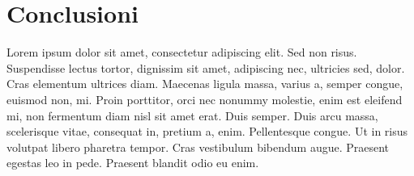 \section*{Conclusioni}
\label{sec:conclusioni}
Lorem ipsum dolor sit amet, consectetur adipiscing elit. Sed non risus. Suspendisse lectus tortor, dignissim sit amet, adipiscing nec, ultricies sed, dolor. Cras elementum ultrices diam. Maecenas ligula massa, varius a, semper congue, euismod non, mi. Proin porttitor, orci nec nonummy molestie, enim est eleifend mi, non fermentum diam nisl sit amet erat. Duis semper. Duis arcu massa, scelerisque vitae, consequat in, pretium a, enim. Pellentesque congue. Ut in risus volutpat libero pharetra tempor. Cras vestibulum bibendum augue. Praesent egestas leo in pede. Praesent blandit odio eu enim.

\clearpage